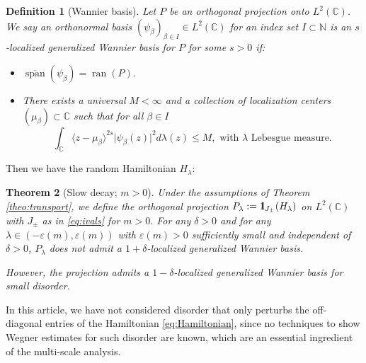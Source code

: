 \documentclass[reqno,12pt,letterpaper]{amsart}
\newcommand{\CC}{{\mathbb C}}
\newtheorem{theo}{Theorem}
\newtheorem{defi}[theo]{Definition}
\numberwithin{equation}{section}
\def\indic{\operatorname{1\hskip-2.75pt\relax l}}
\begin{document}
\begin{defi}[Wannier basis]
\label{def:Wannier}
Let $P$ be an orthogonal projection onto $L^2(\CC)$. We say an orthonormal basis $(\psi_{\beta})_{\beta \in I} \in L^2(\CC)$ for an index set $I \subset \mathbb N$ is an \emph{$s$-localized generalized Wannier basis} for $P$ for some $s>0$ if:
\begin{itemize}
\item $\overline{\operatorname{span}}(\psi_{\beta}) = \operatorname{ran}(P).$
\item There exists a universal $M<\infty$ and a collection of localization centers $(\mu_{\beta}) \subset \CC$ such that for all $\beta \in I$
\[ \int_{\CC} \langle z-\mu_{\beta} \rangle^{2s} \vert \psi_{\beta}(z)\vert^2 d\lambda(z) \le M, \text{ with } \lambda \text{ Lebesgue measure.}\]
\end{itemize}     
\end{defi}
Then we have the random Hamiltonian $H_{\lambda}:$
\begin{theo}[Slow decay; $m>0$]
\label{theo:spectral_deloc}
Under the assumptions of Theorem \ref{theo:transport}, we define the orthogonal projection $P_{\lambda}:= \indic_{J_{\pm}}(H_{\lambda})$ on $L^2(\CC)$ with $J_{\pm}$ as in \eqref{eq:ivals} for $m>0.$
For any $\delta>0$ and for any $\lambda \in (-\varepsilon(m),\varepsilon(m))$ with $\varepsilon(m)>0$ sufficiently small and independent of $\delta>0$, $P_{\lambda}$ does not admit a $1+\delta$-localized generalized Wannier basis. 

However, the projection admits a $1-\delta$-localized generalized Wannier basis for small disorder. 
\end{theo}
In this article, we have not considered disorder that only perturbs the off-diagonal entries of the Hamiltonian \eqref{eq:Hamiltonian}, since no techniques to show Wegner estimates for such disorder are known, which are an essential ingredient of the multi-scale analysis.
\end{document}
